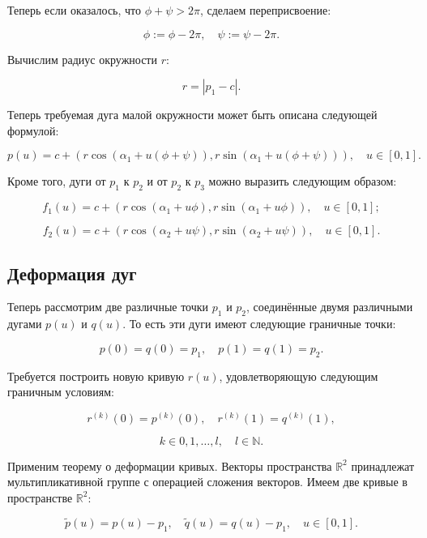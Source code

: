 Теперь если оказалось, что $\phi+\psi>2\pi$, сделаем переприсвоение:

\begin{equation}
\phi:=\phi-2\pi, \quad \psi:=\psi-2\pi.
\label{angle-correction}
\end{equation}

Вычислим радиус окружности $r$:

$$
r=|p_1-c|.
$$

Теперь требуемая дуга малой окружности может быть описана следующей формулой:

$$
p(u)=c+(r\cos(\alpha_1+u(\phi+\psi)),r\sin(\alpha_1+u(\phi+\psi))), \quad u \in [0,1].
$$

Кроме того, дуги от $p_1$ к $p_2$ и от $p_2$ к $p_3$ можно выразить следующим образом:

\begin{equation}
f_1(u)=c+(r\cos(\alpha_1+u\phi),r\sin(\alpha_1+u\phi)), \quad u \in [0,1];
\label{arc-phi}
\end{equation}

\begin{equation}
f_2(u)=c+(r\cos(\alpha_2+u\psi),r\sin(\alpha_2+u\psi)), \quad u \in [0,1].
\label{arc-psi}
\end{equation}

\subsection*{Деформация дуг}

Теперь рассмотрим две различные точки $p_1$ и $p_2$, соединённые двумя различными дугами $p(u)$ и $q(u)$. То есть эти
дуги имеют следующие граничные точки:

$$
p(0)=q(0)=p_1, \quad p(1)=q(1)=p_2.
$$

Требуется построить новую кривую $r(u)$, удовлетворяющую следующим граничным условиям:

$$
r^{(k)}(0)=p^{(k)}(0), \quad r^{(k)}(1)=q^{(k)}(1),
$$

$$
k \in {0,1,\dots,l}, \quad l \in \mathbb{N}.
$$

Применим теорему о деформации кривых. Векторы пространства $\mathbb{R}^2$ принадлежат мультипликативной группе с
операцией сложения векторов. Имеем две кривые в пространстве $\mathbb{R}^2$:

\begin{equation}
\tilde p(u)=p(u)-p_1, \quad \tilde q(u)=q(u)-p_1, \quad u \in [0,1].
\label{arc-length}
\end{equation}

